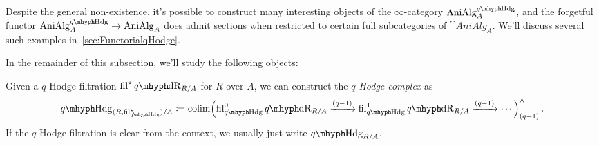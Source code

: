 \documentclass[DIV=12,numbers=enddot,leqno,bibliography=totoc]{scrartcl}
\begin{document}
	\begin{rem}
		Despite the general non-existence, it's possible to construct many interesting objects of the $\infty$-category $\cat{AniAlg}_A^{\qHodge}$, and the forgetful functor $\cat{AniAlg}_A^{\qHodge}\rightarrow \cat{AniAlg}_A$ does admit sections when restricted to certain full subcategories of $\cat{AniAlg}_A$. We'll discuss several such examples in~\cref{sec:FunctorialqHodge}.
	\end{rem}
	
	
	In the remainder of this subsection, we'll study the following objects:
	
	\begin{numpar}\label{par:WellBehavedqHodgeComplex}
		Given a $q$-Hodge filtration $\fil^\star\qdeRham_{R/A}$ for $R$ over $A$, we can construct the \emph{$q$-Hodge complex} as
		\begin{equation*}
			\qHodge_{(R, \fil_{\smash{\qHodge}}^\star )/A}\coloneqq \colimit\Bigl( \fil_{\qHodge}^0\qdeRham_{R/A}\xrightarrow{(q-1)} \fil_{\qHodge}^1\qdeRham_{R/A}\xrightarrow{(q-1)}\dotsb\Bigr)_{(q-1)}^\complete\,.
		\end{equation*}
		If the $q$-Hodge filtration is clear from the context, we usually just write $\qHodge_{R/A}$.
	\end{numpar}
\end{document}
